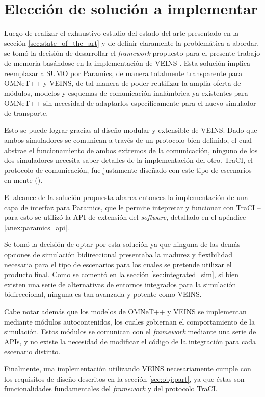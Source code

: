\section{Elección de solución a implementar}\label{sec:solution}

Luego de realizar el exhaustivo estudio del estado del arte presentado en la sección \ref{sec:state_of_the_art} y de definir claramente la problemática a abordar, se tomó la decisión de desarrollar el \emph{framework} propuesto para el presente trabajo de memoria basándose en la implementación de VEINS \autocite{sommer_german_dressler, sommer_dressler2}. Esta solución implica reemplazar a SUMO por Paramics, de manera totalmente transparente para OMNeT++ y VEINS, de tal manera de poder reutilizar la amplia oferta de módulos, modelos y esquemas de comunicación inalámbrica ya existentes para OMNeT++ sin necesidad de adaptarlos específicamente para el nuevo simulador de transporte. 

Esto se puede lograr gracias al diseño modular y extensible de VEINS. Dado que ambos simuladores se comunican a través de un protocolo bien definido, el cual abstrae el funcionamiento de ambos extremos de la comunicación, ninguno de los dos simuladores necesita saber detalles de la implementación del otro. TraCI, el protocolo de comunicación, fue justamente diseñado con este tipo de escenarios en mente (\autocite{traci}).

El alcance de la solución propuesta abarca entonces la implementación de una capa de interfaz para Paramics, que le permite intepretar y funcionar con TraCI -- para esto se utilizó la API de extensión del \emph{software}, detallado en el apéndice \ref{anex:paramics_api}. 

Se tomó la decisión de optar por esta solución ya que ninguna de las demás opciones de simulación bidireccional presentaba la madurez y flexibilidad necesaria para el tipo de escenarios para los cuales se pretende utilizar el producto final. Como se comentó en la sección \ref{sec:integrated_sim}, si bien existen una serie de alternativas de entornos integrados para la simulación bidireccional, ninguna es tan avanzada y potente como VEINS.

Cabe notar además que los modelos de OMNeT++ y VEINS se implementan mediante módulos autocontenidos, los cuales gobiernan el comportamiento de la simulación. Estos módulos se comunican con el \emph{framework} mediante una serie de APIs, y no existe la necesidad de modificar el código de la integración para cada escenario distinto.

Finalmente, una implementación utilizando VEINS necesariamente cumple con los requisitos de diseño descritos en la sección \ref{sec:obj:part}, ya que éstas son funcionalidades fundamentales del \emph{framework} y del protocolo TraCI.